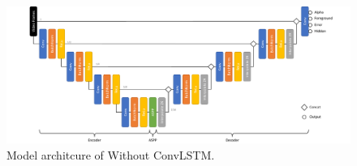 \documentclass[final]{cvpr}
\begin{document}
\begin{figure}[htb]
    \begin{center}
        \includegraphics[width=1\textwidth]{img/model.pdf}
    \end{center}
    \caption{Model architcure of Without ConvLSTM.}
    \label{model}
\end{figure}
\end{document}
